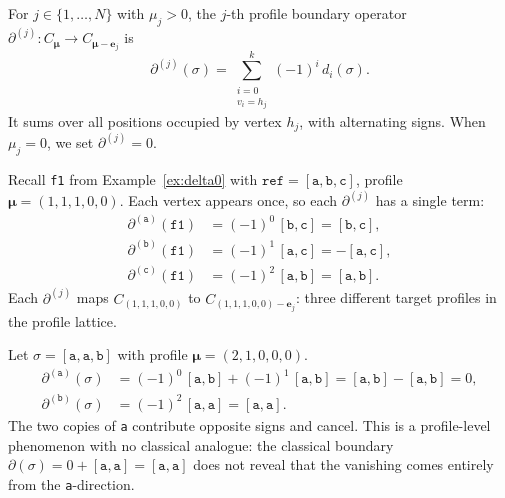 \begin{definition}\label{def:profile-boundary}
For $j \in \{1, \ldots, N\}$ with $\mu_j > 0$, the $j$-th profile boundary operator $\partial^{(j)}: C_{\boldsymbol{\mu}} \to C_{\boldsymbol{\mu} - \mathbf{e}_j}$ is
\[
  \partial^{(j)}(\sigma) = \sum_{\substack{i = 0 \\ v_i = h_j}}^{k} (-1)^i\, d_i(\sigma).
\]
It sums over all positions occupied by vertex $h_j$, with alternating signs. When $\mu_j = 0$, we set $\partial^{(j)} = 0$.
\end{definition}

\begin{example}\label{ex:profile-boundary}
Recall \texttt{f1} from Example~\ref{ex:delta0} with $\texttt{ref} = [\texttt{a}, \texttt{b}, \texttt{c}]$, profile $\boldsymbol{\mu} = (1, 1, 1, 0, 0)$. Each vertex appears once, so each $\partial^{(j)}$ has a single term:
\begin{align*}
  \partial^{(\texttt{a})}(\texttt{f1}) &= (-1)^0\,[\texttt{b}, \texttt{c}] = [\texttt{b}, \texttt{c}], \\
  \partial^{(\texttt{b})}(\texttt{f1}) &= (-1)^1\,[\texttt{a}, \texttt{c}] = -[\texttt{a}, \texttt{c}], \\
  \partial^{(\texttt{c})}(\texttt{f1}) &= (-1)^2\,[\texttt{a}, \texttt{b}] = [\texttt{a}, \texttt{b}].
\end{align*}
Each $\partial^{(j)}$ maps $C_{(1,1,1,0,0)}$ to $C_{(1,1,1,0,0) - \mathbf{e}_j}$: three different target profiles in the profile lattice.
\end{example}

\begin{example}\label{ex:profile-boundary-repeat}
Let $\sigma = [\texttt{a}, \texttt{a}, \texttt{b}]$ with profile $\boldsymbol{\mu} = (2, 1, 0, 0, 0)$.
\begin{align*}
  \partial^{(\texttt{a})}(\sigma) &= (-1)^0\,[\texttt{a}, \texttt{b}] + (-1)^1\,[\texttt{a}, \texttt{b}]
    = [\texttt{a}, \texttt{b}] - [\texttt{a}, \texttt{b}] = 0, \\
  \partial^{(\texttt{b})}(\sigma) &= (-1)^2\,[\texttt{a}, \texttt{a}] = [\texttt{a}, \texttt{a}].
\end{align*}
The two copies of \texttt{a} contribute opposite signs and cancel. This is a profile-level phenomenon with no classical analogue: the classical boundary $\partial(\sigma) = 0 + [\texttt{a}, \texttt{a}] = [\texttt{a}, \texttt{a}]$ does not reveal that the vanishing comes entirely from the \texttt{a}-direction.
\end{example}

